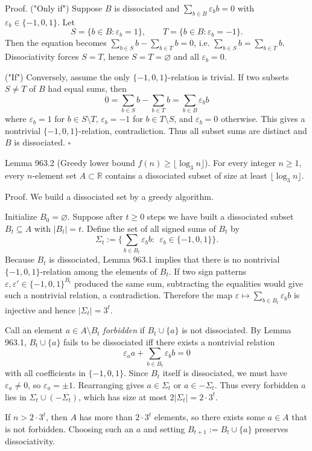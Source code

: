 Proof.
("Only if") Suppose $B$ is dissociated and $\sum_{b\in B}\varepsilon_b b=0$ with $\varepsilon_b\in\{-1,0,1\}$. Let
\[
S=\{b\in B:\varepsilon_b=1\},\qquad T=\{b\in B:\varepsilon_b=-1\}.
\]
Then the equation becomes $\sum_{b\in S} b - \sum_{b\in T} b=0$, i.e. $\sum_{b\in S} b = \sum_{b\in T} b$. Dissociativity forces $S=T$, hence $S=T=\varnothing$ and all $\varepsilon_b=0$.

("If") Conversely, assume the only $\{-1,0,1\}$-relation is trivial. If two subsets $S\ne T$ of $B$ had equal sums, then
\[
0=\sum_{b\in S}b-\sum_{b\in T}b=
\sum_{b\in B}\varepsilon_b b
\]
where $\varepsilon_b=1$ for $b\in S\setminus T$, $\varepsilon_b=-1$ for $b\in T\setminus S$, and $\varepsilon_b=0$ otherwise. This gives a nontrivial $\{-1,0,1\}$-relation, contradiction. Thus all subset sums are distinct and $B$ is dissociated. $\square$

Lemma 963.2 (Greedy lower bound $f(n)\ge \lfloor \log_3 n\rfloor$).
For every integer $n\ge 1$, every $n$-element set $A\subset\mathbb R$ contains a dissociated subset of size at least $\lfloor \log_3 n\rfloor$.

Proof.
We build a dissociated set by a greedy algorithm.

Initialize $B_0=\varnothing$.
Suppose after $t\ge 0$ steps we have built a dissociated subset $B_t\subseteq A$ with $|B_t|=t$.
Define the set of all signed sums of $B_t$ by
\[
\Sigma_t:=\Big\{\sum_{b\in B_t}\varepsilon_b b:\ \ \varepsilon_b\in\{-1,0,1\}\Big\}.
\]
Because $B_t$ is dissociated, Lemma 963.1 implies that there is no nontrivial $\{-1,0,1\}$-relation among the elements of $B_t$.
If two sign patterns $\varepsilon,\varepsilon'\in\{-1,0,1\}^{B_t}$ produced the same sum, subtracting the equalities would give such a nontrivial relation, a contradiction.
Therefore the map $\varepsilon\mapsto\sum_{b\in B_t}\varepsilon_b b$ is injective and hence $|\Sigma_t|=3^t$.

Call an element $a\in A\setminus B_t$ \emph{forbidden} if $B_t\cup\{a\}$ is not dissociated.
By Lemma 963.1, $B_t\cup\{a\}$ fails to be dissociated iff there exists a nontrivial relation
\[
\varepsilon_a a + \sum_{b\in B_t}\varepsilon_b b = 0
\]
with all coefficients in $\{-1,0,1\}$. Since $B_t$ itself is dissociated, we must have $\varepsilon_a\neq 0$, so $\varepsilon_a=\pm 1$.
Rearranging gives $a\in\Sigma_t$ or $a\in-\Sigma_t$.
Thus every forbidden $a$ lies in $\Sigma_t\cup(-\Sigma_t)$, which has size at most $2|\Sigma_t|=2\cdot 3^t$.

If $n>2\cdot 3^t$, then $A$ has more than $2\cdot 3^t$ elements, so there exists some $a\in A$ that is not forbidden.
Choosing such an $a$ and setting $B_{t+1}:=B_t\cup\{a\}$ preserves dissociativity.

